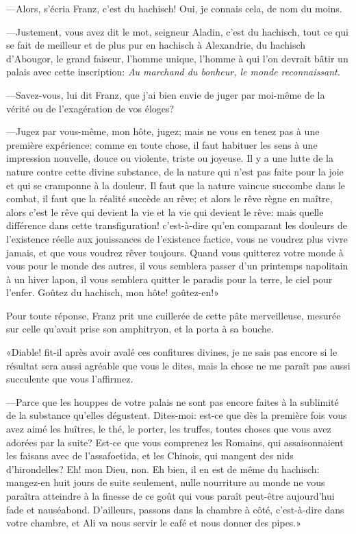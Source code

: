 —Alors, s'écria Franz, c'est du hachisch! Oui, je connais cela, de nom du moins.

—Justement, vous avez dit le mot, seigneur Aladin, c'est du hachisch, tout ce qui se fait de meilleur et de plus pur en hachisch à Alexandrie, du hachisch d'Abougor, le grand faiseur, l'homme unique, l'homme à qui l'on devrait bâtir un palais avec cette inscription: \textit{Au marchand du bonheur, le monde reconnaissant.}

—Savez-vous, lui dit Franz, que j'ai bien envie de juger par moi-même de la vérité ou de l'exagération de vos éloges?

—Jugez par vous-même, mon hôte, jugez; mais ne vous en tenez pas à une première expérience: comme en toute chose, il faut habituer les sens à une impression nouvelle, douce ou violente, triste ou joyeuse. Il y a une lutte de la nature contre cette divine substance, de la nature qui n'est pas faite pour la joie et qui se cramponne à la douleur. Il faut que la nature vaincue succombe dans le combat, il faut que la réalité succède au rêve; et alors le rêve règne en maître, alors c'est le rêve qui devient la vie et la vie qui devient le rêve: mais quelle différence dans cette transfiguration! c'est-à-dire qu'en comparant les douleurs de l'existence réelle aux jouissances de l'existence factice, vous ne voudrez plus vivre jamais, et que vous voudrez rêver toujours. Quand vous quitterez votre monde à vous pour le monde des autres, il vous semblera passer d'un printemps napolitain à un hiver lapon, il vous semblera quitter le paradis pour la terre, le ciel pour l'enfer. Goûtez du hachisch, mon hôte! goûtez-en!»

Pour toute réponse, Franz prit une cuillerée de cette pâte merveilleuse, mesurée sur celle qu'avait prise son amphitryon, et la porta à sa bouche.

«Diable! fit-il après avoir avalé ces confitures divines, je ne sais pas encore si le résultat sera aussi agréable que vous le dites, mais la chose ne me paraît pas aussi succulente que vous l'affirmez.

—Parce que les houppes de votre palais ne sont pas encore faites à la sublimité de la substance qu'elles dégustent. Dites-moi: est-ce que dès la première fois vous avez aimé les huîtres, le thé, le porter, les truffes, toutes choses que vous avez adorées par la suite? Est-ce que vous comprenez les Romains, qui assaisonnaient les faisans avec de l'assafoetida, et les Chinois, qui mangent des nids d'hirondelles? Eh! mon Dieu, non. Eh bien, il en est de même du hachisch: mangez-en huit jours de suite seulement, nulle nourriture au monde ne vous paraîtra atteindre à la finesse de ce goût qui vous paraît peut-être aujourd'hui fade et nauséabond. D'ailleurs, passons dans la chambre à côté, c'est-à-dire dans votre chambre, et Ali va nous servir le café et nous donner des pipes.»

